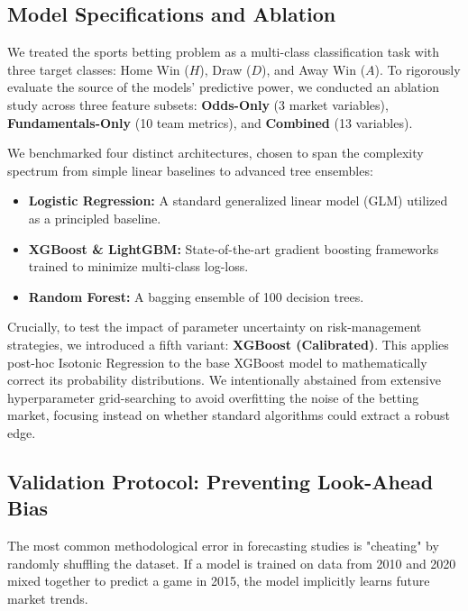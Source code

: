 \documentclass[pdflatex,sn-basic]{sn-jnl}
\begin{document}
\subsection{Model Specifications and Ablation}
We treated the sports betting problem as a multi-class classification task with three target classes: Home Win ($H$), Draw ($D$), and Away Win ($A$). To rigorously evaluate the source of the models' predictive power, we conducted an ablation study across three feature subsets: \textbf{Odds-Only} (3 market variables), \textbf{Fundamentals-Only} (10 team metrics), and \textbf{Combined} (13 variables).

We benchmarked four distinct architectures, chosen to span the complexity spectrum from simple linear baselines to advanced tree ensembles:
\begin{itemize}
    \item \textbf{Logistic Regression:} A standard generalized linear model (GLM) utilized as a principled baseline.
    \item \textbf{XGBoost \& LightGBM:} State-of-the-art gradient boosting frameworks trained to minimize multi-class log-loss.
    \item \textbf{Random Forest:} A bagging ensemble of 100 decision trees.
\end{itemize}

Crucially, to test the impact of parameter uncertainty on risk-management strategies, we introduced a fifth variant: \textbf{XGBoost (Calibrated)}. This applies post-hoc Isotonic Regression to the base XGBoost model to mathematically correct its probability distributions. We intentionally abstained from extensive hyperparameter grid-searching to avoid overfitting the noise of the betting market, focusing instead on whether standard algorithms could extract a robust edge.

\subsection{Validation Protocol: Preventing Look-Ahead Bias}
The most common methodological error in forecasting studies is "cheating" by randomly shuffling the dataset. If a model is trained on data from 2010 and 2020 mixed together to predict a game in 2015, the model implicitly learns future market trends.
\end{document}
